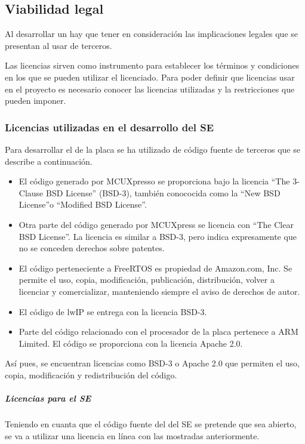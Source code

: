 {{{{{{\subsection{Viabilidad legal}
Al desarrollar un  hay que tener en consideración
las implicaciones legales que se presentan al usar 
de terceros.

Las licencias sirven como instrumento para establecer los términos y condiciones
en los que se pueden utilizar el  licenciado. Para
poder definir que licencias usar en el proyecto es necesario conocer las
licencias utilizadas y la restricciones que pueden imponer.

\subsubsection{Licencias utilizadas en el desarrollo del SE}
Para desarrollar el  de la placa se ha utilizado
de código fuente de terceros que se describe a continuación.
\begin{itemize}
  \item El código generado por MCUXpresso se proporciona bajo la licencia
  ``The 3-Clause BSD License'' (BSD-3), también conococida como la
  ``New BSD License''o ``Modified BSD License''.
  \item Otra parte del código generado por MCUXpress se licencia con 
  ``The Clear BSD License''. La licencia es similar a BSD-3, pero indica
  expresamente que no se conceden derechos sobre patentes.
  \item El código perteneciente a FreeRTOS es propiedad de Amazon.com, Inc.
  Se permite el uso, copia, modificación, publicación, distribución, volver a
  licenciar y comercializar, manteniendo siempre el aviso de derechos de autor.
  \item El código de lwIP se entrega con la licencia BSD-3.
  \item Parte del código relacionado con el procesador de la placa pertenece a
  ARM Limited. El código se proporciona con la licencia Apache 2.0.
\end{itemize}

Así pues, se encuentran licencias como BSD-3 o Apache 2.0 que permiten el uso,
copia, modificación y redistribución del código.



\subparagraph{Licencias para el SE}
Teniendo en cuanta que el código fuente del  del SE
se pretende que sea abierto, se va a utilizar una licencia en línea con las
mostradas anteriormente.

}}}}}}

